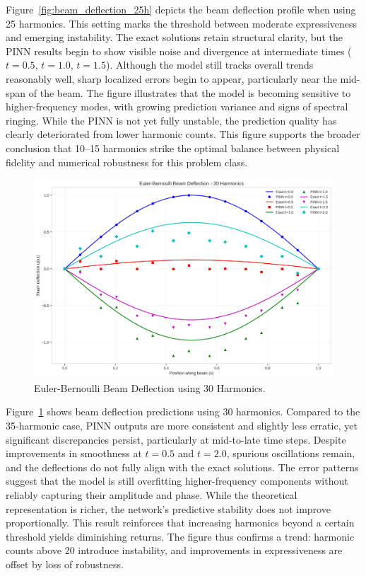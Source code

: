 \documentclass[preprint,12pt]{elsarticle}
\begin{document}
Figure~\ref{fig:beam_deflection_25h} depicts the beam deflection profile when using 25 harmonics. This setting marks the threshold between moderate expressiveness and emerging instability. The exact solutions retain structural clarity, but the PINN results begin to show visible noise and divergence at intermediate times ($t=0.5$, $t=1.0$, $t=1.5$). Although the model still tracks overall trends reasonably well, sharp localized errors begin to appear, particularly near the mid-span of the beam. The figure illustrates that the model is becoming sensitive to higher-frequency modes, with growing prediction variance and signs of spectral ringing. While the PINN is not yet fully unstable, the prediction quality has clearly deteriorated from lower harmonic counts. This figure supports the broader conclusion that 10–15 harmonics strike the optimal balance between physical fidelity and numerical robustness for this problem class.

\begin{figure}[t]
    \centering
    \includegraphics[width=0.9\linewidth]{figures/euler_bernoulli_beam_30h.png}
    \caption{Euler-Bernoulli Beam Deflection using 30 Harmonics.}
    \label{fig:beam_deflection_30h}
\end{figure}

Figure~\ref{fig:beam_deflection_30h} shows beam deflection predictions using 30 harmonics. Compared to the 35-harmonic case, PINN outputs are more consistent and slightly less erratic, yet significant discrepancies persist, particularly at mid-to-late time steps. Despite improvements in smoothness at $t=0.5$ and $t=2.0$, spurious oscillations remain, and the deflections do not fully align with the exact solutions. The error patterns suggest that the model is still overfitting higher-frequency components without reliably capturing their amplitude and phase. While the theoretical representation is richer, the network’s predictive stability does not improve proportionally. This result reinforces that increasing harmonics beyond a certain threshold yields diminishing returns. The figure thus confirms a trend: harmonic counts above 20 introduce instability, and improvements in expressiveness are offset by loss of robustness.
\end{document}
